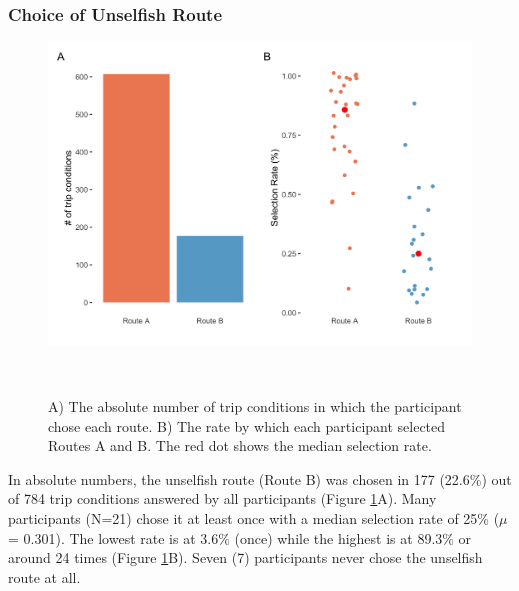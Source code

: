 \subsubsection{Choice of Unselfish Route}

\begin{figure}[h]
\centering
  \includegraphics[scale=.2]{figures/s3-rc-all.png}
  \caption{A) The absolute number of trip conditions in which the participant chose each route. B) The rate by which each participant selected Routes A and B. The red dot shows the median selection rate.}~\label{fig:s3-rc-all}
\end{figure}

In absolute numbers, the unselfish route (Route B) was chosen in 177 (22.6\%) out of 784 trip conditions answered by all participants (Figure \ref{fig:s3-rc-all}A). Many participants (N=21) chose it at least once with a median selection rate of 25\% ($\mu$ =  0.301). The lowest rate is at 3.6\% (once) while the highest is at 89.3\% or around 24 times (Figure \ref{fig:s3-rc-all}B). Seven (7) participants never chose the unselfish route at all. 

